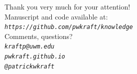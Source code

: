 \begin{frame}%
  \begin{center}
  \large{Thank you very much for your attention!}\\ \vspace{2em}
  Manuscript and code available at:\\
  \emph{\texttt{https://github.com/pwkraft/knowledge}}\\ \vspace{2em}
  Comments, questions?\\
  \emph{\faEnvelopeO\hspace{.5em}\texttt{kraftp@uwm.edu}}\\\vspace{2em}
  \emph{\faGlobe\hspace{.5em}\texttt{pwkraft.github.io}}\\
  \emph{\faTwitter\hspace{.5em}\texttt{@patrickwkraft}}\\
  \end{center}
\end{frame}

